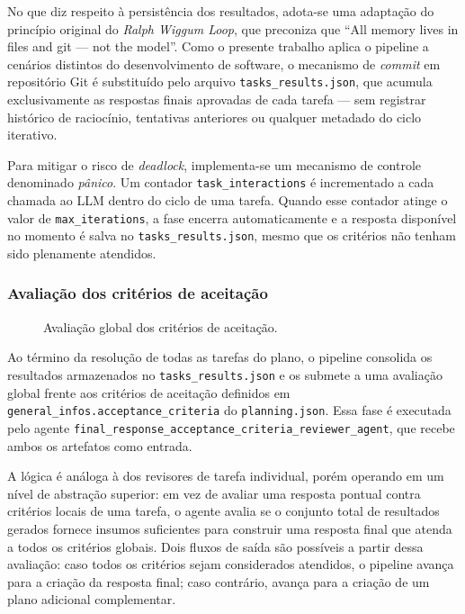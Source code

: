 \documentclass[a4paper,10pt,twocolumn]{article}
\begin{document}
No que diz respeito à persistência dos resultados, adota-se uma adaptação do princípio original do \textit{Ralph Wiggum Loop}, que preconiza que ``All memory lives in files and git — not the model''. Como o presente trabalho aplica o pipeline a cenários distintos do desenvolvimento de software, o mecanismo de \textit{commit} em repositório Git é substituído pelo arquivo \texttt{tasks\_results.json}, que acumula exclusivamente as respostas finais aprovadas de cada tarefa — sem registrar histórico de raciocínio, tentativas anteriores ou qualquer metadado do ciclo iterativo.

Para mitigar o risco de \textit{deadlock}, implementa-se um mecanismo de controle denominado \textit{pânico}. Um contador \texttt{task\_interactions} é incrementado a cada chamada ao LLM dentro do ciclo de uma tarefa. Quando esse contador atinge o valor de \texttt{max\_iterations}, a fase encerra automaticamente e a resposta disponível no momento é salva no \texttt{tasks\_results.json}, mesmo que os critérios não tenham sido plenamente atendidos.

\subsubsection{Avaliação dos critérios de aceitação}

\begin{figure}[H]
  \centering
  
  \caption{Avaliação global dos critérios de aceitação.}
  \label{fig:avaliacao_criterios}
\end{figure}

Ao término da resolução de todas as tarefas do plano, o pipeline consolida os resultados armazenados no \texttt{tasks\_results.json} e os submete a uma avaliação global frente aos critérios de aceitação definidos em \texttt{general\_infos.acceptance\_criteria} do \texttt{planning.json}. Essa fase é executada pelo agente {\scriptsize\texttt{final\_response\_acceptance\_criteria\_reviewer\_agent}}, que recebe ambos os artefatos como entrada.

A lógica é análoga à dos revisores de tarefa individual, porém operando em um nível de abstração superior: em vez de avaliar uma resposta pontual contra critérios locais de uma tarefa, o agente avalia se o conjunto total de resultados gerados fornece insumos suficientes para construir uma resposta final que atenda a todos os critérios globais. Dois fluxos de saída são possíveis a partir dessa avaliação: caso todos os critérios sejam considerados atendidos, o pipeline avança para a criação da resposta final; caso contrário, avança para a criação de um plano adicional complementar.
\end{document}
